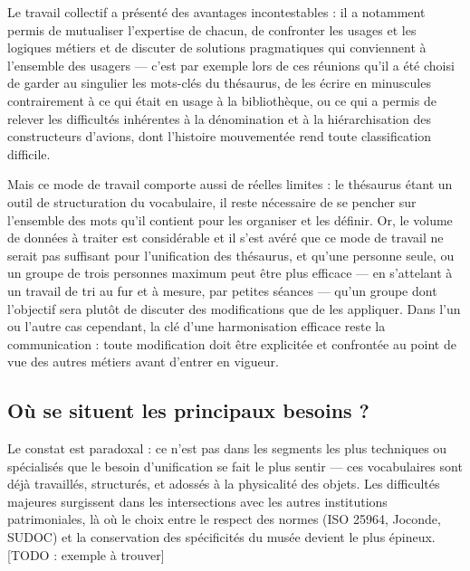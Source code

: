 Le travail collectif a présenté des avantages incontestables : il a notamment permis de mutualiser l'expertise de chacun, de confronter les usages et les logiques métiers et de discuter de solutions pragmatiques qui conviennent à l'ensemble des usagers --- c'est par exemple lors de ces réunions qu'il a été choisi de garder au singulier les mots-clés du thésaurus, de les écrire en minuscules contrairement à ce qui était en usage à la bibliothèque, ou ce qui a permis de relever les difficultés inhérentes à la dénomination et à la hiérarchisation des constructeurs d'avions, dont l'histoire mouvementée rend toute classification difficile.

Mais ce mode de travail comporte aussi de réelles limites : le thésaurus étant un outil de structuration du vocabulaire, il reste nécessaire de se pencher sur l'ensemble des mots qu'il contient pour les organiser et les définir. Or, le volume de données à traiter est considérable et il s'est avéré que ce mode de travail ne serait pas suffisant pour l'unification des thésaurus, et qu'une personne seule, ou un groupe de trois personnes maximum peut être plus efficace --- en s'attelant à un travail de tri au fur et à mesure, par petites séances --- qu'un groupe dont l'objectif sera plutôt de discuter des modifications que de les appliquer. Dans l'un ou l'autre cas cependant, la clé d'une harmonisation efficace reste la communication : toute modification doit être explicitée et confrontée au point de vue des autres métiers avant d'entrer en vigueur.


\subsection{Où se situent les principaux besoins ?}

Le constat est paradoxal : ce n’est pas dans les segments les plus techniques ou spécialisés que le besoin d’unification se fait le plus sentir --- ces vocabulaires sont déjà travaillés, structurés, et adossés à la physicalité des objets. Les difficultés majeures surgissent dans les intersections avec les autres institutions patrimoniales, là où le choix entre le respect des normes (ISO 25964, Joconde, SUDOC) et la conservation des spécificités du musée devient le plus épineux.  [TODO : exemple à trouver]